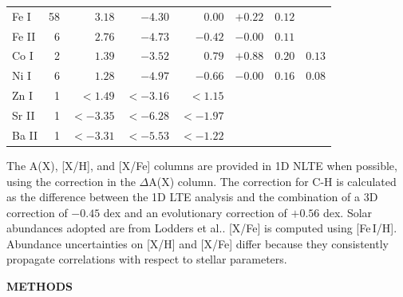 \documentclass{natureprintstyle}
\begin{document}
\begin{table}
\begin{tabular}{lrrrrrcc}
Fe I  & 58 &$   { 3.18}$&$   {-4.30}$&$   { 0.00}$&$+0.22$&$0.12$&$    $\\ %
Fe II &  6 &$   { 2.76}$&$   {-4.73}$&$   {-0.42}$&$-0.00$&$0.11$&$    $\\ %
Co I  &  2 &$   { 1.39}$&$   {-3.52}$&$   { 0.79}$&$+0.88$&$0.20$&$0.13$\\ %
Ni I  &  6 &$   { 1.28}$&$   {-4.97}$&$   {-0.66}$&$-0.00$&$0.16$&$0.08$\\ %
Zn I  &  1 &${<}{ 1.49}$&${<}{-3.16}$&${<}{ 1.15}$&       &$    $&$    $\\ %
Sr II &  1 &${<}{-3.35}$&${<}{-6.28}$&${<}{-1.97}$&       &$    $&$    $\\ %
Ba II &  1 &${<}{-3.31}$&${<}{-5.53}$&${<}{-1.22}$&       &$    $&$    $\\ %
\hline
\end{tabular}
The A(X), [X/H], and [X/Fe] columns are provided in 1D NLTE when possible, using the correction in the $\Delta$A(X) column.
The correction for C-H is calculated as the difference between the 1D LTE analysis and the combination of a 3D correction of $-0.45$ dex\cite{Eitner2024} and an evolutionary correction of $+0.56$ dex\cite{Placco2014}.
Solar abundances adopted are from Lodders et al.\cite{Lodders2025}.
[X/Fe] is computed using [Fe\,I/H].
Abundance uncertainties on [X/H] and [X/Fe] differ because they consistently propagate correlations with respect to stellar parameters.
\end{table}

\newpage

\begin{center}
{\bf \Large \uppercase{Methods} }
\end{center}
\end{document}
